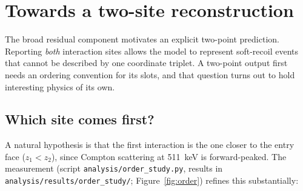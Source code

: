 \documentclass[11pt,a4paper]{article}
\newcommand{\code}[1]{\texttt{#1}}
\begin{document}
\section{Towards a two-site reconstruction}
\label{sec:twosite}

The broad residual component motivates an explicit two-point prediction. Reporting
\emph{both} interaction sites allows the model to represent soft-recoil events that
cannot be described by one coordinate triplet. A two-point output first needs
an ordering convention for its slots, and that question turns out to hold
interesting physics of its own.

\subsection{Which site comes first?}
\label{sec:order}

A natural hypothesis is that the first interaction is the one closer to the
entry face ($z_1 < z_2$), since Compton scattering at 511~keV is
forward-peaked. The measurement (script \code{analysis/order\_study.py},
results in \code{analysis/results/order\_study/};
Figure~\ref{fig:order}) refines this substantially:
\end{document}
